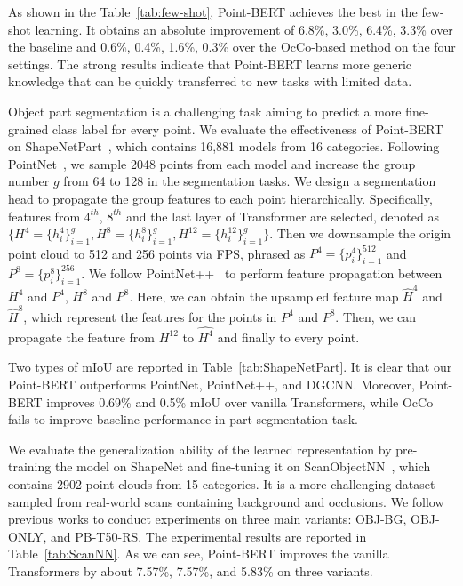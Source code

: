 As shown in the Table~\ref{tab:few-shot}, Point-BERT achieves the best in the few-shot learning. It obtains an absolute improvement of 6.8\%, 3.0\%, 6.4\%, 3.3\% over the baseline and 0.6\%, 0.4\%, 1.6\%, 0.3\% over the OcCo-based method on the four settings. The strong results indicate that Point-BERT learns more generic knowledge that can be quickly transferred to new tasks with limited data.

Object part segmentation is a challenging task aiming to predict a more fine-grained class label for every point.
We evaluate the effectiveness of Point-BERT on  ShapeNetPart~\cite{yi2016scalable}, which contains 16,881 models from 16 categories. Following PointNet~\cite{pointnet}, we sample 2048 points from each model and increase the group number $g$ from 64 to 128 in the segmentation tasks. We design a segmentation head to propagate the group features to each point hierarchically.
Specifically, features from $4^{th}$, $8^{th}$ and the last layer of Transformer are selected, denoted as $\{ H^4 = \{h_i^4\}_{i=1}^g , H^8 = \{h_i^8\}_{i=1}^g , H^{12} = \{h_i^{12}\}_{i=1}^g \}$.
 Then we downsample the origin point cloud to 512 and 256 points via FPS, phrased as $P^4 = \{p^4_i\}_{i=1}^{512}$ and $ P^8= \{p^8_i\}_{i=1}^{256}$. We follow PointNet++~\cite{pointnet2} to perform feature propagation between $H^4$ and $P^4$, $H^8$ and $P^8$. Here, we can obtain the upsampled feature map $\hat{H}^4$ and $\hat{H}^8$, which represent the features for the points in $P^4$ and $P^8$. Then, we can propagate the feature from $H^{12}$ to $\hat{H^4}$ and finally to every  point. 

Two types of mIoU are reported in Table~\ref{tab:ShapeNetPart}. It is clear that our Point-BERT outperforms PointNet, PointNet++, and DGCNN. Moreover, Point-BERT improves 0.69\% and 0.5\% mIoU over vanilla Transformers, while OcCo fails to improve baseline performance in part segmentation task.

 We evaluate the generalization ability of the learned representation by pre-training the model on ShapeNet and fine-tuning it on ScanObjectNN~\cite{uy2019revisiting}, which contains 2902 point clouds from 15 categories. It is a more challenging dataset sampled from real-world scans containing background and occlusions. We follow previous works to conduct experiments on three main variants: OBJ-BG, OBJ-ONLY, and PB-T50-RS. The experimental results are reported in Table~\ref{tab:ScanNN}. 
As we can see, Point-BERT improves the vanilla Transformers by about 7.57\%, 7.57\%, and 5.83\% on three variants. 

